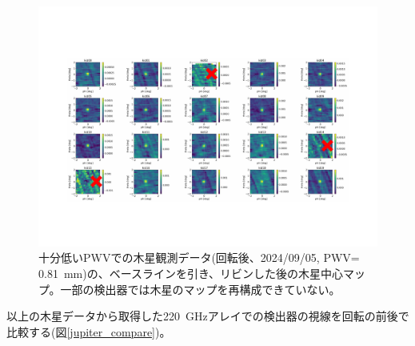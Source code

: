 \begin{figure}[htbp]
  \centering
  \includegraphics[width=0.9\columnwidth]{5_alignment/figs/11280_jupiter_mod.pdf}
  \caption{十分低いPWVでの木星観測データ(回転後、2024/09/05, PWV= \SI{0.81}{mm})の、ベースラインを引き、リビンした後の木星中心マップ。一部の検出器では木星のマップを再構成できていない。}
  \label{11280_jupiter_mod}
\end{figure}
以上の木星データから取得した\SI{220}{GHz}アレイでの検出器の視線を回転の前後で比較する(図\ref{jupiter_compare})。
